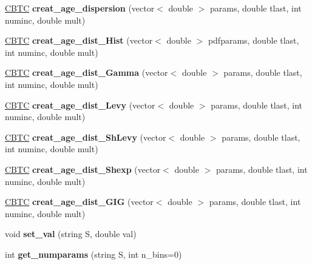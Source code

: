 \begin{DoxyCompactItemize}
\item 
\mbox{\label{class_c_well_a429a97b831f9de375d5f73d58b391df8}} 
\hyperlink{class_c_b_t_c}{C\+B\+TC} {\bfseries creat\+\_\+age\+\_\+dispersion} (vector$<$ double $>$ params, double tlast, int numinc, double mult)
\item 
\mbox{\label{class_c_well_a690d28b27f4f4f8d8ca3e9fe210335e8}} 
\hyperlink{class_c_b_t_c}{C\+B\+TC} {\bfseries creat\+\_\+age\+\_\+dist\+\_\+\+Hist} (vector$<$ double $>$ pdfparams, double tlast, int numinc, double mult)
\item 
\mbox{\label{class_c_well_a5d2f79a252bd713690699cb66b0dc2fb}} 
\hyperlink{class_c_b_t_c}{C\+B\+TC} {\bfseries creat\+\_\+age\+\_\+dist\+\_\+\+Gamma} (vector$<$ double $>$ params, double tlast, int numinc, double mult)
\item 
\mbox{\label{class_c_well_a86bc61664c1b2a5c62824e7111a78a62}} 
\hyperlink{class_c_b_t_c}{C\+B\+TC} {\bfseries creat\+\_\+age\+\_\+dist\+\_\+\+Levy} (vector$<$ double $>$ params, double tlast, int numinc, double mult)
\item 
\mbox{\label{class_c_well_a23cf26bcdfed25297d31ec4beccf29bb}} 
\hyperlink{class_c_b_t_c}{C\+B\+TC} {\bfseries creat\+\_\+age\+\_\+dist\+\_\+\+Sh\+Levy} (vector$<$ double $>$ params, double tlast, int numinc, double mult)
\item 
\mbox{\label{class_c_well_a3885f22900a3acffcffa19a2b70a296b}} 
\hyperlink{class_c_b_t_c}{C\+B\+TC} {\bfseries creat\+\_\+age\+\_\+dist\+\_\+\+Shexp} (vector$<$ double $>$ params, double tlast, int numinc, double mult)
\item 
\mbox{\label{class_c_well_a1f3745cf873efb27121d011b427c944a}} 
\hyperlink{class_c_b_t_c}{C\+B\+TC} {\bfseries creat\+\_\+age\+\_\+dist\+\_\+\+G\+IG} (vector$<$ double $>$ params, double tlast, int numinc, double mult)
\item 
\mbox{\label{class_c_well_ad9f44bae0c347c78fbf79e7c63e2f534}} 
void {\bfseries set\+\_\+val} (string S, double val)
\item 
\mbox{\label{class_c_well_aebc8f8b2a00859ad64e855ee5bbdca1c}} 
int {\bfseries get\+\_\+numparams} (string S, int n\+\_\+bins=0)
\end{DoxyCompactItemize}
